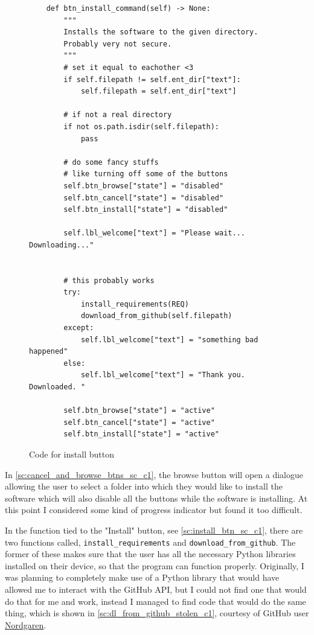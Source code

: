 \documentclass[11pt]{article}
\begin{document}
            \begin{figure}[!ht]
                \begin{verbatim}
    def btn_install_command(self) -> None:
        """ 
        Installs the software to the given directory. 
        Probably very not secure. 
        """
        # set it equal to eachother <3
        if self.filepath != self.ent_dir["text"]:
            self.filepath = self.ent_dir["text"]
            
        # if not a real directory
        if not os.path.isdir(self.filepath):
            pass
        
        # do some fancy stuffs
        # like turning off some of the buttons
        self.btn_browse["state"] = "disabled"
        self.btn_cancel["state"] = "disabled"
        self.btn_install["state"] = "disabled"
        
        self.lbl_welcome["text"] = "Please wait... Downloading..."
        
        
        # this probably works
        try:
            install_requirements(REQ)
            download_from_github(self.filepath)
        except:
            self.lbl_welcome["text"] = "something bad happened"
        else:
            self.lbl_welcome["text"] = "Thank you. Downloaded. "
        
        self.btn_browse["state"] = "active"
        self.btn_cancel["state"] = "active"
        self.btn_install["state"] = "active"
                \end{verbatim}
                \caption{Code for install button}
                \label{sc:install_btn_sc_c1}
            \end{figure}


            In \autoref{sc:cancel_and_browse_btns_sc_c1}, the browse button will open a dialogue allowing the user to select a folder into which they would like to install the software which will also disable all the buttons while the software is installing. At this point I considered some kind of progress indicator but found it too difficult.


            In the function tied to the "Install" button, see \autoref{sc:install_btn_sc_c1}, there are two functions called, \verb|install_requirements| and \verb|download_from_github|. The former of these makes sure that the user has all the necessary Python libraries installed on their device, so that the program can function properly. Originally, I was planning to completely make use of a Python library that would have allowed me to interact with the GitHub API, but I could not find one that would do that for me and work, instead I managed to find code that would do the same thing, which is shown in \autoref{sc:dl_from_github_stolen_c1}, courtesy of GitHub user \href{https://github.com/Nordgaren/Github-Folder-Downloader/tree/master}{Nordgaren}.
\end{document}
